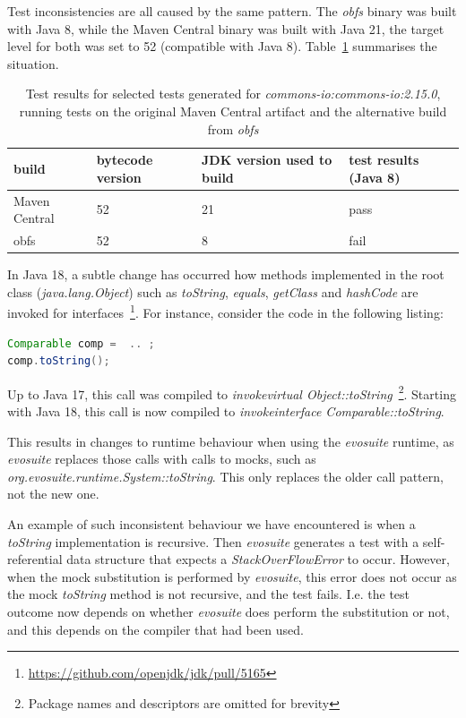 \documentclass[conference]{IEEEtran}
\begin{document}
Test inconsistencies are all caused by the same pattern.  The \textit{obfs} binary was built  with Java 8, while the Maven Central binary was built with Java 21, the target level for both was set to 52 (compatible with Java 8). Table~\ref{tab:stackoverflow} summarises the situation.


\begin{table}[h]
	\begin{tabular}{|p{2.0cm}p{1.2cm}p{1.8cm}p{1.5cm}|}
		\hline
		build         & bytecode version & JDK version used to build & test results (Java 8)                                            \\ \hline 
		Maven Central & 52       & 21                        & pass                                                                                        \\
		obfs         & 52               & 8                        & fail              \\ \hline
	\end{tabular}
	\caption{Test results for selected tests generated for  \textit{commons-io:commons-io:2.15.0}, running tests on the original Maven Central artifact and the alternative build from \textit{obfs}}
	\label{tab:stackoverflow}
\end{table}

In Java 18, a subtle change has occurred   how methods implemented in the root class (\textit{java.lang.Object}) such as \textit{toString}, \textit{equals}, \textit{getClass} and \textit{hashCode} are invoked for interfaces~\footnote{\url{https://github.com/openjdk/jdk/pull/5165}}.
For instance, consider the code in the following listing:

\begin{lstlisting}[language=Java]
Comparable comp =  .. ; 
comp.toString();
\end{lstlisting}	

Up to Java 17, this call was compiled to \textit{invokevirtual Object::toString}~\footnote{Package names and descriptors are omitted for brevity}. Starting with Java 18, this call is now compiled to \textit{invokeinterface Comparable::toString}.

This results in changes to runtime behaviour when using the \textit{evosuite} runtime, as \textit{evosuite} replaces those calls with calls to mocks, such as  \textit{org.evosuite.runtime.System::toString}. This only replaces the older call pattern, not the new one. 

An example of such inconsistent behaviour we have encountered  is when a \textit{toString} implementation is recursive. Then \textit{evosuite} generates a test with a self-referential data structure that expects a \textit{StackOverFlowError} to occur. However, when the mock substitution is performed by \textit{evosuite}, this error does not occur as the mock \textit{toString} method is not recursive, and the test fails. I.e. the test outcome now depends on whether \textit{evosuite} does perform the substitution or not, and this depends on the compiler that had been used.
\end{document}
